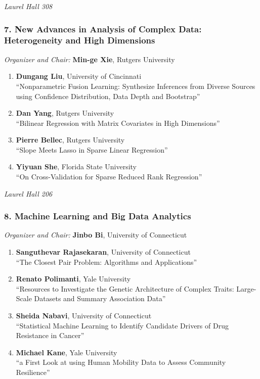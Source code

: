 \emph{Laurel Hall 308} \\[.5em]

\subsubsection*{7. New Advances in Analysis of Complex Data: Heterogeneity and High Dimensions}

\emph{Organizer and Chair:} \textbf{Min-ge Xie}, Rutgers University

\begin{enumerate}
\item \textbf{Dungang Liu}, University of Cincinnati \\
``Nonparametric Fusion Learning: Synthesize Inferences from Diverse Sources using Confidence Distribution, Data Depth and Bootstrap''
\item \textbf{Dan Yang}, Rutgers University \\
``Bilinear Regression with Matrix Covariates in High Dimensions''
\item \textbf{Pierre Bellec}, Rutgers University \\
``Slope Meets Lasso in Sparse Linear Regression''
\item \textbf{Yiyuan She}, Florida State University \\
``On Cross-Validation for Sparse Reduced Rank Regression''
\end{enumerate}

\emph{Laurel Hall 206} \\[.5em]

\subsubsection*{8. Machine Learning and Big Data Analytics}

\emph{Organizer and Chair:} \textbf{Jinbo Bi}, University of Connecticut

\begin{enumerate}
\item \textbf{Sanguthevar Rajasekaran}, University of Connecticut \\
``The Closest Pair Problem: Algorithms and Applications''
\item \textbf{Renato Polimanti}, Yale University \\
``Resources to Investigate the Genetic Architecture of Complex Traits: Large-Scale Datasets and Summary Association Data''
\item \textbf{Sheida Nabavi}, University of Connecticut \\
``Statistical Machine Learning to Identify Candidate Drivers of Drug Resistance in Cancer''
\item \textbf{Michael Kane}, Yale University \\
``a First Look at using Human Mobility Data to Assess Community Resilience''
\end{enumerate}

